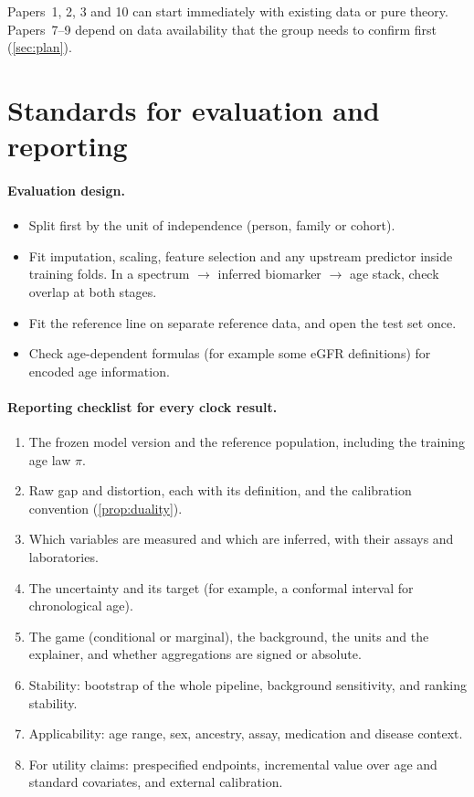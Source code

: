 \documentclass[11pt,a4paper]{article}
\theoremstyle{plain}
\theoremstyle{definition}
\theoremstyle{remark}
\begin{document}
Papers~1, 2, 3 and 10 can start immediately with existing data or pure theory. Papers~7--9 depend on data availability that the group needs to confirm first (\cref{sec:plan}).

\clearpage
\section{Standards for evaluation and reporting}
\label{sec:standards}

\paragraph{Evaluation design.}
\begin{itemize}
\item Split first by the unit of independence (person, family or cohort).
\item Fit imputation, scaling, feature selection and any upstream predictor inside training folds. In a spectrum $\to$ inferred biomarker $\to$ age stack, check overlap at both stages.
\item Fit the reference line on separate reference data, and open the test set once.
\item Check age-dependent formulas (for example some eGFR definitions) for encoded age information.
\end{itemize}

\paragraph{Reporting checklist for every clock result.}
\begin{enumerate}
\item The frozen model version and the reference population, including the training age law $\pi$.
\item Raw gap and distortion, each with its definition, and the calibration convention (\cref{prop:duality}).
\item Which variables are measured and which are inferred, with their assays and laboratories.
\item The uncertainty and its target (for example, a conformal interval for chronological age).
\item The game (conditional or marginal), the background, the units and the explainer, and whether aggregations are signed or absolute.
\item Stability: bootstrap of the whole pipeline, background sensitivity, and ranking stability.
\item Applicability: age range, sex, ancestry, assay, medication and disease context.
\item For utility claims: prespecified endpoints, incremental value over age and standard covariates, and external calibration.
\end{enumerate}
\end{document}
